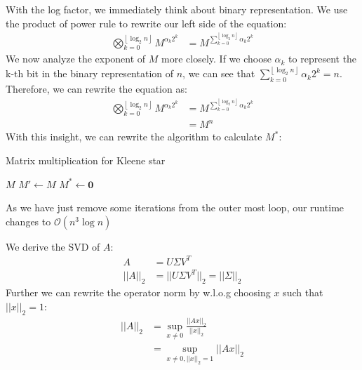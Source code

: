 \documentclass[a4paper,12pt]{ETHexercise}
\begin{document}
\begin{question}
\begin{subquestion}
		With the log factor, we immediately think about binary representation. We use the product of power rule to rewrite our left side of the equation:
		\begin{align}
			\bigotimes_{k=0}^{\left\lfloor \log_2 n \right\rfloor} M^{\alpha_k 2^k} & = M^{\sum_{k=0}^{\left\lfloor \log_2 n \right\rfloor} \alpha_k 2^k}
		\end{align}
		We now analyze the exponent of $M$ more closely. If we choose $\alpha_k$ to represent the k-th bit in the binary representation of $n$, we can see that $\sum_{k=0}^{\left\lfloor \log_2 n \right\rfloor}\alpha_k 2^k = n$. Therefore, we can rewrite the equation as:
		\begin{align}
			\bigotimes_{k=0}^{\left\lfloor \log_2 n \right\rfloor} M^{\alpha_k 2^k} & = M^{\sum_{k=0}^{\left\lfloor \log_2 n \right\rfloor} \alpha_k 2^k} \\
			                                                                        & = M^n
		\end{align}
		With this insight, we can rewrite the algorithm to calculate $M^*$:\\
		\begin{algorithm}[H]
			\label{M_star}
			\caption{Matrix multiplication for Kleene star}
			$M$\;
			$M' \gets M$\;
			$M^* \gets \mathbf{0}$\;
		\end{algorithm}
		As we have just remove some iterations from the outer most loop, our runtime changes to $\mathcal{O}(n^3 \log n)$
	\end{subquestion}
	\begin{subquestion}
		We derive the SVD of $A$:
		\begin{align}
			A       & = U \Sigma V^T                      \\
			||A||_2 & = ||U \Sigma V^T||_2 = ||\Sigma||_2
		\end{align}
		Further we can rewrite the operator norm by w.l.o.g choosing $x$ such that $||x||_2 = 1$:
		\begin{align}
			||A||_2 & = \sup_{x \neq 0} \frac{||Ax||_2}{||x||_2} \\
			        & = \sup_{x \neq 0, ||x||_2 = 1} ||Ax||_2    \\
		\end{align}

\end{subquestion}
\end{question}
\end{document}
